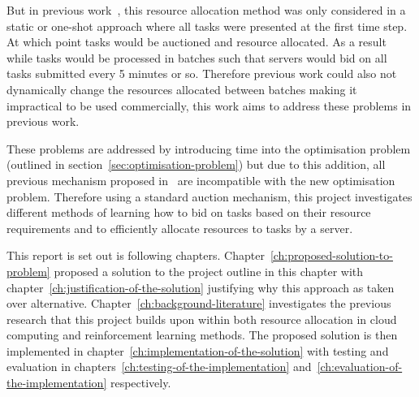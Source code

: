 But in previous work~\citep{FlexibleResourceAllocation}, this resource allocation method was only considered in a static
or one-shot approach where all tasks were presented at the first time step. At which point tasks would be auctioned
and resource allocated. As a result while tasks would be processed in batches such that servers would bid on all tasks
submitted every 5 minutes or so. Therefore previous work could also not dynamically change the resources allocated
between batches making it impractical to be used commercially, this work aims to address these problems in previous work.

These problems are addressed by introducing time into the optimisation problem (outlined in
section~\ref{sec:optimisation-problem}) but due to this addition, all previous mechanism proposed
in~\cite{FlexibleResourceAllocation} are incompatible with the new optimisation problem. Therefore using a standard
auction mechanism, this project investigates different methods of learning how to bid on tasks based on their resource
requirements and to efficiently allocate resources to tasks by a server.

This report is set out is following chapters. Chapter~\ref{ch:proposed-solution-to-problem} proposed a solution
to the project outline in this chapter with chapter~\ref{ch:justification-of-the-solution} justifying why this
approach as taken over alternative. Chapter~\ref{ch:background-literature} investigates the previous research
that this project builds upon within both resource allocation in cloud computing and reinforcement learning methods.
The proposed solution is then implemented in chapter~\ref{ch:implementation-of-the-solution} with testing and
evaluation in chapters~\ref{ch:testing-of-the-implementation} and~\ref{ch:evaluation-of-the-implementation} respectively.
